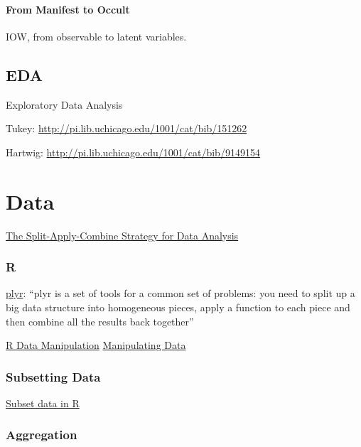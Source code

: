\documentclass[reqno,12pt]{tufte-book}
\numberwithin{equation}{subsection}
\begin{document}
\subsection{From Manifest to Occult}

IOW, from observable to latent variables.

\chapter{EDA}

Exploratory Data Analysis

Tukey: \url{http://pi.lib.uchicago.edu/1001/cat/bib/151262}

Hartwig: \url{http://pi.lib.uchicago.edu/1001/cat/bib/9149154}

\part{Data}

\href{http://www.jstatsoft.org/v40/i01}{The Split-Apply-Combine Strategy for Data Analysis}


\section{R}
\label{sect:r}

\href{http://plyr.had.co.nz/}{plyr}: ``plyr is a set of tools for a
common set of problems: you need to split up a big data structure into
homogeneous pieces, apply a function to each piece and then combine
all the results back together''


\href{http://rprogramming.net/r-data-manipulation/}{R Data Manipulation}
\href{http://www.cookbook-r.com/Manipulating\_data/}{Manipulating Data}

\section{Subsetting Data}
\label{sect:datasubsetting}

\href{http://rprogramming.net/subset-data-in-r/}{Subset data in R}

\section{Aggregation}
\label{sect:dataaggregate}
\end{document}
